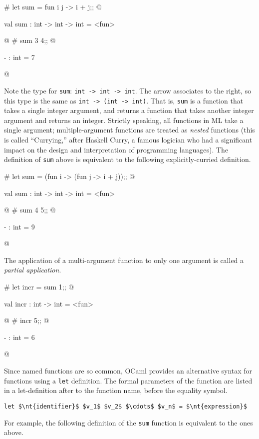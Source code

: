 \begin{ocaml}
# let sum = fun i j -> i + j;;
@
\begin{topoutput}
val sum : int -> int -> int = <fun>
\end{topoutput}
@
# sum 3 4;;
@
\begin{topoutput}
- : int = 7
\end{topoutput}
@
\end{ocaml}
%
Note the type for \hbox{\lstinline/sum/}: \hbox{\lstinline/int -> int -> int/}.  The arrow
associates to the right, so this type is the same as
\hbox{\hbox{\lstinline/int -> (int -> int)/}}.
That is, \hbox{\lstinline/sum/} is a function that takes a single integer
argument, and returns a function that takes another integer argument
and returns an integer.  Strictly speaking, all functions in ML take a
single argument; multiple-argument functions are treated as
\emph{nested} functions (this is called ``Currying,'' after Haskell
Curry, a famous logician who had a significant impact on the design
and interpretation of programming languages).  The definition of
\hbox{\lstinline/sum/} above is equivalent to the following explicitly-curried
definition.

\begin{ocaml}
# let sum = (fun i -> (fun j -> i + j));;
@
\begin{topoutput}
val sum : int -> int -> int = <fun>
\end{topoutput}
@
# sum 4 5;;
@
\begin{topoutput}
- : int = 9
\end{topoutput}
@
\end{ocaml}
%
The application of a multi-argument function to only one
argument is called a \emph{partial application}.

\begin{ocaml}
# let incr = sum 1;;
@
\begin{topoutput}
val incr : int -> int = <fun>
\end{topoutput}
@
# incr 5;;
@
\begin{topoutput}
- : int = 6
\end{topoutput}
@
\end{ocaml}
%
Since named functions are so common, OCaml provides an alternative
syntax for functions using a \hbox{\lstinline/let/} definition.  The formal
parameters of the function are listed in a let-definition after to the function name,
before the equality symbol.

\begin{center}
\lstinline!let $\nt{identifier}$ $v_1$ $v_2$ $\cdots$ $v_n$ = $\nt{expression}$!
\end{center}
%
For example, the following definition of the \hbox{\lstinline/sum/} function
is equivalent to the ones above.

